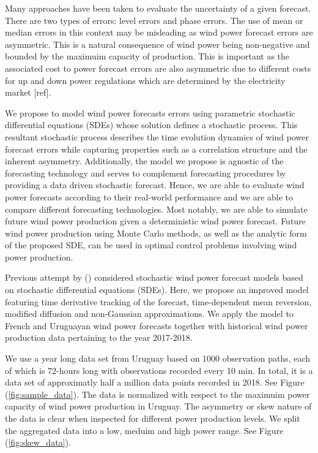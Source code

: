 \documentclass[11pt,english]{article}
\begin{document}
Many approaches have been taken to evaluate the uncertainty of a given forecast. There are two types of errors: level errors and phase errors. The use of mean or median errors in this context may be misleading as wind power forecast errors are asymmetric. This is a natural consequence of wind power being non-negative and bounded by the maximuim capacity of production. This is important as the associated cost to power forecast errors are also asymmetric due to different costs for up and down  power regulations which are determined by the electricity market [ref].

We propose to model wind power forecasts errors using parametric stochastic differential equations (SDEs) whose solution defines a stochastic process. This resultant stochastic process describes the time evolution dynamics of wind power forecast errors while capturing properties such as a correlation structure and the inherent asymmetry. Additionally, the model we propose is agnostic of the forecasting technology and serves to complement forecasting procedures by providing a data driven stochastic forecast. Hence, we are able to evaluate wind power forecasts according to their real-world performance and we are able to compare different forecasting technologies. Most notably, we are able to simulate future wind power production given a deterministic wind power forecast. Future wind power production using Monte Carlo methods, as well as the analytic form of the proposed SDE, can be used in optimal control problems involving wind power production.

Previous attempt by (\cite{mozuma}) considered stochastic wind power forecast models based on stochastic differential equations (SDEs). Here, we propose an improved model featuring time derivative tracking of the forecast, time-dependent mean reversion, modified diffusion and non-Gaussian approximations. We apply the model to French and Uruguayan wind power forecasts together with historical wind power production data pertaining to the year 2017-2018.

We use a year long data set from Uruguay based on 1000 observation paths, each of which is 72-hours long with observations recorded every 10 min. In total, it is a data set of approximatly half a million data points recorded in 2018. See Figure (\ref{fig:sample_data}). The data is normalized with respect to the maximuim power capacity of wind power production in Uruguay. The asymmetry or skew nature of the data is clear when inspected for different power production levels. We split the aggregated data into a low, meduim and high power range. See Figure (\ref{fig:skew_data}).
\end{document}
